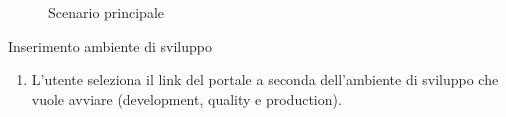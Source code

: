 \begin{figure}[h]
    \centering
    \caption{Scenario principale}\label{fig:usecase-scenario-principale}
\end{figure}



\clearpage    


\begin{usecase}{1}{Inserimento ambiente di sviluppo}\label{uc:inserimento-ambiente-di-sviluppo}

    \usecasemain{}
        \begin{enumerate}
            \item L'utente seleziona il link del portale a seconda dell'ambiente di sviluppo che vuole avviare (development, quality e production).
        \end{enumerate}

\end{usecase}

